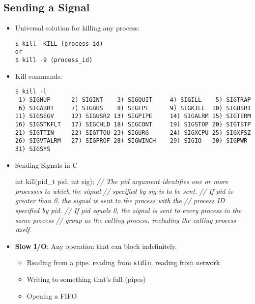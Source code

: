 \documentclass[]{article}
\newenvironment{Shaded}{}{}
\newcommand{\DataTypeTok}[1]{\textcolor[rgb]{0.56,0.13,0.00}{#1}}
\newcommand{\CommentTok}[1]{\textcolor[rgb]{0.38,0.63,0.69}{\textit{#1}}}
\newcommand{\NormalTok}[1]{#1}
\begin{document}
\subsection{\texorpdfstring{\textbf{Sending a
Signal}}{Sending a Signal}}\label{header-n520}

\begin{itemize}
\item
  Universal solution for killing any process:

\begin{verbatim}
$ kill -KILL (process_id)
or
$ kill -9 (process_id)
\end{verbatim}
\item
  Kill commands:

\begin{verbatim}
$ kill -l
 1) SIGHUP	 	2) SIGINT	 3) SIGQUIT	 	4) SIGILL	 5) SIGTRAP
 6) SIGABRT	 	7) SIGBUS	 8) SIGFPE	 	9) SIGKILL	10) SIGUSR1
11) SIGSEGV		12) SIGUSR2	13) SIGPIPE		14) SIGALRM	15) SIGTERM
16) SIGSTKFLT	17) SIGCHLD	18) SIGCONT		19) SIGSTOP	20) SIGTSTP
21) SIGTTIN		22) SIGTTOU	23) SIGURG		24) SIGXCPU	25) SIGXFSZ
26) SIGVTALRM	27) SIGPROF	28) SIGWINCH	29) SIGIO	30) SIGPWR
31) SIGSYS
\end{verbatim}
\item
  Sending Signals in C

\begin{Shaded}
\begin{Highlighting}[]
\DataTypeTok{int}\NormalTok{ kill(pid_t pid, }\DataTypeTok{int}\NormalTok{ sig);}
\CommentTok{// The pid argument identifies one or more processes to which the signal }
\CommentTok{// specified by sig is to be sent.}
\CommentTok{// 		If pid is greater than 0, the signal is sent to the process with the }
\CommentTok{// 		process ID specified by pid.}
\CommentTok{// 		If pid equals 0, the signal is sent to every process in the same process}
\CommentTok{//		group as the calling process, including the calling process itself.}
\end{Highlighting}
\end{Shaded}
\item
  \textbf{Slow I/O}: Any operation that can block indefinitely.

  \begin{itemize}
  \item
    Reading from a pipe. reading from \texttt{stdin}, reading from
    network.
  \item
    Writing to something that's full (pipes)
  \item
    Opening a FIFO
  \end{itemize}
\end{itemize}
\end{document}
